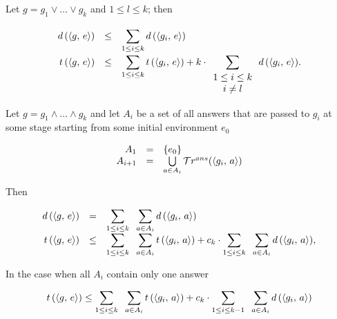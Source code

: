 \begin{lemma}
\label{lem:disjunction_metrics_calc}

Let $g = g_1 \lor \dots \lor g_k$ and $1 \le l \le k$; then

\[
\renewcommand{\arraystretch}{1.5}
\begin{array}{rcl}
  d\,(\taskst{g}{e}) &\le& \displaystyle\sum\limits_{1 \le i \le k} d\,(\taskst{g_i}{e}) \\
  t\,(\taskst{g}{e}) &\le& \displaystyle\sum\limits_{1 \le i \le k} t\,(\taskst{g_i}{e}) + k\cdot \displaystyle\sum\limits_{\renewcommand{\arraystretch}{1}\begin{array}{c}1 \le i \le k \\ i \ne l\end{array}} d\,(\taskst{g_i}{e}).
\end{array}
\]

\end{lemma}

\begin{lemma}
\label{lem:conjunction_metrics_calc}

Let $g = g_1 \land \dots \land g_k$ and let $A_i$ be a set of all answers that are passed to $g_i$ at some stage starting from some initial environment $e_0$

\[
\begin{array}{rcl}
A_1 &=& \{ e_0 \} \\
A_{i + 1} & = & \bigcup\limits_{a \in A_i} \mathcal{T}r^{ans}(\langle g_i ,\, a \rangle) 
\end{array}
\]

Then

\[
\begin{array}{rcl}
d\,(\langle g ,\, e \rangle) &=& \displaystyle\sum\limits_{1 \le i \le k} \;\; \displaystyle\sum\limits_{a \in A_i} d\,(\langle g_i ,\, a \rangle) \\
t\,(\langle g ,\, e \rangle) &\le& \displaystyle\sum\limits_{1 \le i \le k} \;\; \displaystyle\sum\limits_{a \in A_i} t\,(\langle g_i ,\, a \rangle) + c_k \cdot \displaystyle\sum\limits_{1 \le i \le k} \;\; \displaystyle\sum\limits_{a \in A_i} d\,(\langle g_i ,\, a \rangle), \\
\end{array}
\]

In the case when all $A_i$ contain only one answer

\[
t\,(\langle g ,\, e \rangle) \le \displaystyle\sum\limits_{1 \le i \le k} \;\; \displaystyle\sum\limits_{a \in A_i} t\,(\langle g_i ,\, a \rangle) + c_k \cdot \displaystyle \sum\limits_{1 \le i \le k - 1} \;\; \displaystyle\sum\limits_{a \in A_i} d\,(\langle g_i ,\, a \rangle)
\]

\end{lemma}
